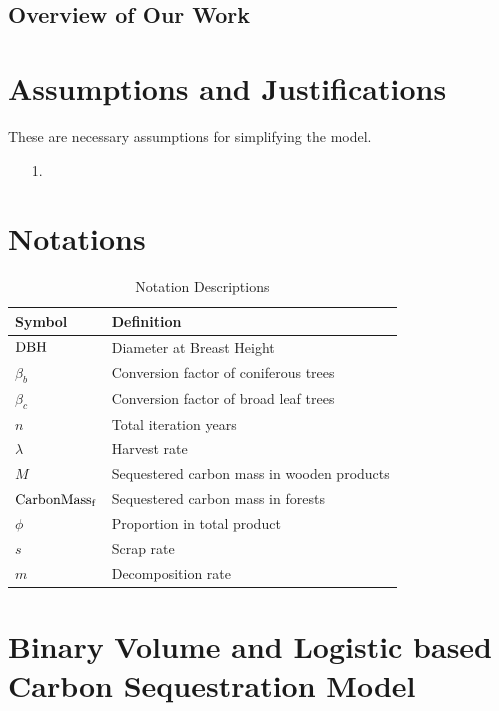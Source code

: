 \documentclass{mcmthesis}
\numberwithin{figure}{section}
\numberwithin{table}{section}
\numberwithin{equation}{section}
\begin{document}
\newpage
\subsection{Overview of Our Work}

\section{Assumptions and Justifications}
These are necessary assumptions for simplifying the model.
\begin{enumerate}
  \item [1.] 
\end{enumerate}


\section{Notations}

\renewcommand\arraystretch{1.5}

\begin{table}[htpb!]
  \centering
  \caption{Notation Descriptions}
  \begin{tabular}{m{2.5cm}<{\centering}|m{12.5cm}<{\centering}}
  \toprule[1.5pt]
  \textbf{Symbol} & \textbf{Definition} \\ \hline
  $ \rm{DBH} $ & Diameter at Breast Height \\
  $ \beta_b $ & Conversion factor of coniferous trees\\
  $\beta_c$ & Conversion factor of broad leaf trees\\
  $ n $ & Total iteration years\\
  $ \lambda $ & Harvest rate\\
  $ M $ & Sequestered carbon mass in wooden products \\
  $ \rm{CarbonMass_f} $ & Sequestered carbon mass in forests \\
  $ \phi $ & Proportion in total product\\
  $ s $ & Scrap rate\\
  $ m $ & Decomposition rate \\

  \bottomrule[1.5pt]
  \end{tabular}
\end{table}


\section{Binary Volume and Logistic based Carbon Sequestration Model}
\end{document}
